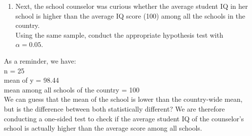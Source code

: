 \documentclass[12pt,letterpaper]{article}
\begin{document}
\begin{enumerate}
 I then calculate the margins of error:
 
 Result:
 \begin{verbatim}
 	> margin_error
 	[1] 4.480072
 \end{verbatim} 
 
 With the margins of error, I can determine the upper and lower bounds of the confidence interval:
 
 Result:
 \begin{verbatim}
 	> print(c(lower_bound, upper_bound))
 	[1]  93.95993 102.92007
 \end{verbatim} 
 
 Now we can check our result with the R-commands:
   
 Result: 
 \begin{verbatim}
 	> print(confidence_interval)
 	[1]  93.95993 102.92007
 	attr(,"conf.level")
 	[1] 0.9
 \end{verbatim}
 We find the same! We can conclude: \\

\textbf{A 90\% confidence interval for the average student IQ in the school would be between 93.96 and 102.92 (rounded). That means that if we sample a hundred times, 90\% of the time we will be right and the average will lie in that interval.}

\vspace{1cm}

	
	\item Next, the school counselor was curious  whether  the average student IQ in her school is higher than the average IQ score (100) among all the schools in the country.\\ 
	
	\noindent Using the same sample, conduct the appropriate hypothesis test with $\alpha=0.05$.
\end{enumerate}

As a reminder, we have: \\
n = 25 \\
mean of y = 98.44 \\
mean among all schools of the country = 100 \\
 

We can guess that the mean of the school is lower than the country-wide mean, but is the difference between both statistically different?
We are therefore conducting a one-sided test to check if the average student IQ of the counselor's school is actually higher than the average score among all schools.
\end{document}
